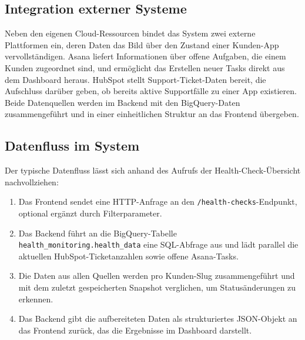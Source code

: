 \subsection{Integration externer Systeme}
Neben den eigenen Cloud-Ressourcen bindet das System zwei externe Plattformen ein, deren Daten das Bild über den Zustand einer Kunden-App vervollständigen. Asana liefert Informationen über offene Aufgaben, die einem Kunden zugeordnet sind, und ermöglicht das Erstellen neuer Tasks direkt aus dem Dashboard heraus. HubSpot stellt Support-Ticket-Daten bereit, die Aufschluss darüber geben, ob bereits aktive Supportfälle zu einer App existieren. Beide Datenquellen werden im Backend mit den BigQuery-Daten zusammengeführt und in einer einheitlichen Struktur an das Frontend übergeben.

\subsection{Datenfluss im System}
Der typische Datenfluss lässt sich anhand des Aufrufs der Health-Check-Übersicht nachvollziehen:

\begin{enumerate}
\item Das Frontend sendet eine HTTP-Anfrage an den \texttt{/health-checks}-Endpunkt, optional ergänzt durch Filterparameter.
\item Das Backend führt an die BigQuery-Tabelle \texttt{health\_monitoring.health\_data} eine SQL-Abfrage aus und lädt parallel die aktuellen HubSpot-Ticketanzahlen sowie offene Asana-Tasks.
\item Die Daten aus allen Quellen werden pro Kunden-Slug zusammengeführt und mit dem zuletzt gespeicherten Snapshot verglichen, um Statusänderungen zu erkennen.
\item Das Backend gibt die aufbereiteten Daten als strukturiertes JSON-Objekt an das Frontend zurück, das die Ergebnisse im Dashboard darstellt.
\end{enumerate}

